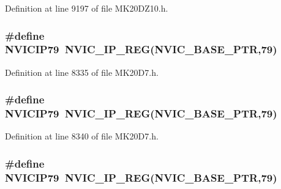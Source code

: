 Definition at line 9197 of file M\+K20\+D\+Z10.\+h.

\subsubsection[{\texorpdfstring{N\+V\+I\+C\+I\+P79}{NVICIP79}}]{\setlength{\rightskip}{0pt plus 5cm}\#define N\+V\+I\+C\+I\+P79~{\bf N\+V\+I\+C\+\_\+\+I\+P\+\_\+\+R\+EG}({\bf N\+V\+I\+C\+\_\+\+B\+A\+S\+E\+\_\+\+P\+TR},79)}\hypertarget{group___n_v_i_c___register___accessor___macros_gac391b9dc561595503007174e4695c9e3}{}\label{group___n_v_i_c___register___accessor___macros_gac391b9dc561595503007174e4695c9e3}


Definition at line 8335 of file M\+K20\+D7.\+h.

\subsubsection[{\texorpdfstring{N\+V\+I\+C\+I\+P79}{NVICIP79}}]{\setlength{\rightskip}{0pt plus 5cm}\#define N\+V\+I\+C\+I\+P79~{\bf N\+V\+I\+C\+\_\+\+I\+P\+\_\+\+R\+EG}({\bf N\+V\+I\+C\+\_\+\+B\+A\+S\+E\+\_\+\+P\+TR},79)}\hypertarget{group___n_v_i_c___register___accessor___macros_gac391b9dc561595503007174e4695c9e3}{}\label{group___n_v_i_c___register___accessor___macros_gac391b9dc561595503007174e4695c9e3}


Definition at line 8340 of file M\+K20\+D7.\+h.

\subsubsection[{\texorpdfstring{N\+V\+I\+C\+I\+P79}{NVICIP79}}]{\setlength{\rightskip}{0pt plus 5cm}\#define N\+V\+I\+C\+I\+P79~{\bf N\+V\+I\+C\+\_\+\+I\+P\+\_\+\+R\+EG}({\bf N\+V\+I\+C\+\_\+\+B\+A\+S\+E\+\_\+\+P\+TR},79)}\hypertarget{group___n_v_i_c___register___accessor___macros_gac391b9dc561595503007174e4695c9e3}{}\label{group___n_v_i_c___register___accessor___macros_gac391b9dc561595503007174e4695c9e3}


